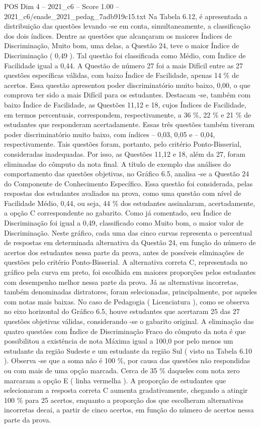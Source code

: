 \begin{textsample}{POS Dim 4 – 2021\_c6 – Score 1.00 – 2021\_c6/enade\_2021\_pedag\_7adb919c15.txt}
Na Tabela 6.12, é apresentada a distribuição das questões levando -se em conta, simultaneamente, a classificação dos dois índices.
Dentre as questões que alcançaram os maiores Índices de Discriminação, Muito bom, uma delas, a Questão 24, teve o maior Índice de Discriminação ( 0,49 ).
Tal questão foi classificada como Médio, com Índice de Facilidade igual a 0,44.
A Questão de número 27 foi a mais Difícil entre as 27 questões específicas válidas, com baixo Índice de Facilidade, apenas 14 \% de acertos.
Essa questão apresentou poder discriminatório muito baixo, 0,00, o que comprova ter sido a mais Difícil para os estudantes.
Destacam -se, também com baixo Índice de Facilidade, as Questões 11,12 e 18, cujos Índices de Facilidade, em termos percentuais, correspondem, respectivamente, a 36 \%, 22 \% e 21 \% de estudantes que responderam acertadamente.
Essas três questões também tiveram poder discriminatório muito baixo, com índices – 0,03, 0,05 e – 0,04, respectivamente.
Tais questões foram, portanto, pelo critério Ponto-Bisserial, consideradas inadequadas.
Por isso, as Questões 11,12 e 18, além da 27, foram eliminadas do cômputo da nota final.
A título de exemplo das análises do comportamento das questões objetivas, no Gráfico 6.5, analisa -se a Questão 24 do Componente de Conhecimento Específico.
Essa questão foi considerada, pelas respostas dos estudantes avaliados na prova, como uma questão com nível de Facilidade Médio, 0,44, ou seja, 44 \% dos estudantes assinalaram, acertadamente, a opção C correspondente ao gabarito.
Como já comentado, seu Índice de Discriminação foi igual a 0,49, classificado como Muito bom, o maior valor de Discriminação.
Neste gráfico, cada uma das cinco curvas representa o percentual de respostas em determinada alternativa da Questão 24, em função do número de acertos dos estudantes nessa parte da prova, antes de possíveis eliminações de questões pelo critério Ponto-Bisserial.
A alternativa correta C, representada no gráfico pela curva em preto, foi escolhida em maiores proporções pelos estudantes com desempenho melhor nessa parte da prova.
Já as alternativas incorretas, também denominadas distratores, foram selecionadas, principalmente, por aqueles com notas mais baixas.
No caso de Pedagogia ( Licenciatura ), como se observa no eixo horizontal do Gráfico 6.5, houve estudantes que acertaram 25 das 27 questões objetivas válidas, considerando -se o gabarito original.
A eliminação das quatro questões com Índice de Discriminação Fraco do cômputo da nota é que possibilitou a existência de nota Máxima igual a 100,0 por pelo menos um estudante da região Sudeste e um estudante da região Sul ( visto na Tabela 6.10 ).
Observa -se que a soma não é 100 \%, por causa das questões não respondidas ou com mais de uma opção marcada.
Cerca de 35 \% daqueles com nota zero marcaram a opção E ( linha vermelha ).
A proporção de estudantes que selecionaram a resposta correta C aumenta gradativamente, chegando a atingir 100 \% para 25 acertos, enquanto a proporção dos que escolheram alternativas incorretas decai, a partir de cinco acertos, em função do número de acertos nessa parte da prova.

\end{textsample}
